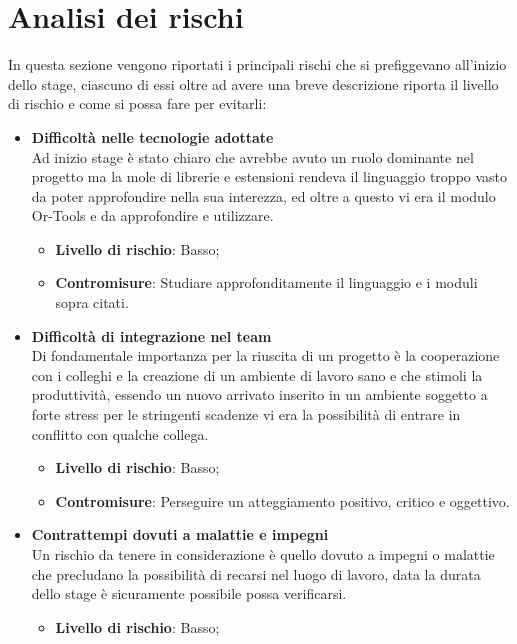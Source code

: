 \section{Analisi dei rischi}
In questa sezione vengono riportati i principali rischi che si prefiggevano all'inizio dello stage, ciascuno di essi oltre ad avere una breve descrizione riporta il livello di rischio e come si possa fare per evitarli:
\begin{itemize}
	\item \textbf{Difficoltà nelle tecnologie adottate}\\
	      Ad inizio stage è stato chiaro che  avrebbe avuto un ruolo dominante nel progetto ma la mole di librerie e estensioni rendeva il linguaggio troppo vasto da poter approfondire nella sua interezza, ed oltre a questo vi era il modulo Or-Tools e  da approfondire e utilizzare.
	      \begin{itemize}
	      	\item \textbf{Livello di rischio}: Basso;
	      	\item \textbf{Contromisure}: Studiare approfonditamente il linguaggio  e i moduli sopra citati.
	      \end{itemize}
	\item \textbf{Difficoltà di integrazione nel team}\\
	      Di fondamentale importanza per la riuscita di un progetto è la cooperazione con i colleghi e la creazione di un ambiente di lavoro sano e che stimoli la produttività, essendo un nuovo arrivato inserito in un ambiente soggetto a forte stress per le stringenti scadenze vi era la possibilità di entrare in conflitto con qualche collega.
	      \begin{itemize}
	      	\item \textbf{Livello di rischio}: Basso;
	      	\item \textbf{Contromisure}: Perseguire un atteggiamento positivo, critico e oggettivo.
	      \end{itemize}
	\item \textbf{Contrattempi dovuti a malattie e impegni}\\
	      Un rischio da tenere in considerazione è quello dovuto a impegni o malattie che precludano la possibilità di recarsi nel luogo di lavoro, data la durata dello stage è sicuramente possibile possa verificarsi.
	      \begin{itemize}
	      	\item \textbf{Livello di rischio}: Basso;

\end{itemize}
\end{itemize}
